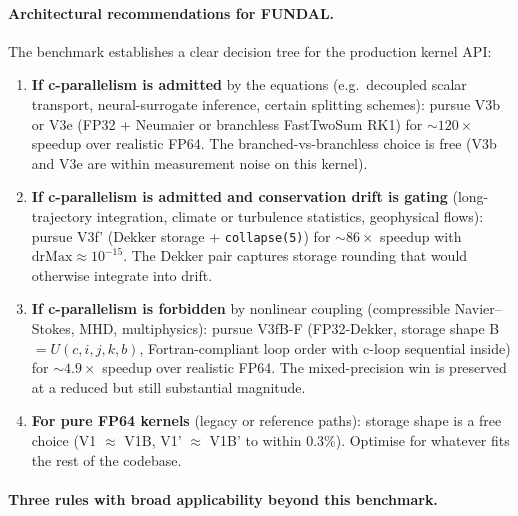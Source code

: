 \documentclass[11pt,a4paper]{article}
\begin{document}
\paragraph{Architectural recommendations for FUNDAL.}
The benchmark establishes a clear decision tree for the production
kernel API:

\begin{enumerate}
  \item \textbf{If c-parallelism is admitted} by the equations (e.g.\
    decoupled scalar transport, neural-surrogate inference, certain
    splitting schemes): pursue V3b or V3e (FP32 + Neumaier or
    branchless FastTwoSum RK1) for \(\sim\!120\times\) speedup over
    realistic FP64. The branched-vs-branchless choice is free
    (V3b and V3e are within measurement noise on this kernel).
  \item \textbf{If c-parallelism is admitted and conservation drift
    is gating} (long-trajectory integration, climate or turbulence
    statistics, geophysical flows): pursue V3f' (Dekker storage +
    \texttt{collapse(5)}) for \(\sim\!86\times\) speedup with
    \(\mathrm{drMax} \approx 10^{-15}\). The Dekker pair captures
    storage rounding that would otherwise integrate into drift.
  \item \textbf{If c-parallelism is forbidden} by nonlinear coupling
    (compressible Navier--Stokes, MHD, multiphysics): pursue V3fB-F
    (FP32-Dekker, storage shape B \(=U(c,i,j,k,b)\), Fortran-compliant
    loop order with c-loop sequential inside) for \(\sim\!4.9\times\)
    speedup over realistic FP64. The mixed-precision win is preserved
    at a reduced but still substantial magnitude.
  \item \textbf{For pure FP64 kernels} (legacy or reference paths):
    storage shape is a free choice (V1 \(\approx\) V1B, V1' \(\approx\)
    V1B' to within 0.3\%). Optimise for whatever fits the rest of the
    codebase.
\end{enumerate}

\paragraph{Three rules with broad applicability beyond this benchmark.}
\end{document}
